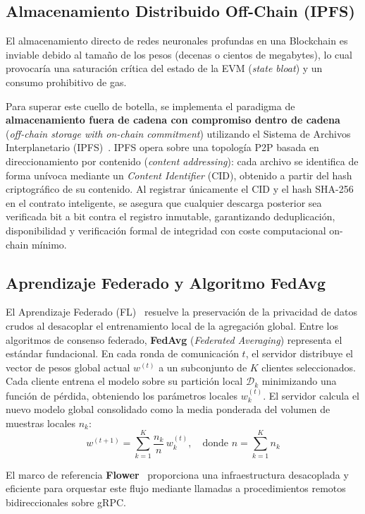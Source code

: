 \subsection{Almacenamiento Distribuido Off-Chain (IPFS)}
El almacenamiento directo de redes neuronales profundas en una Blockchain es inviable debido al tamaño de los pesos (decenas o cientos de megabytes), lo cual provocaría una saturación crítica del estado de la EVM (\textit{state bloat}) y un consumo prohibitivo de gas.

Para superar este cuello de botella, se implementa el paradigma de \textbf{almacenamiento fuera de cadena con compromiso dentro de cadena} (\textit{off-chain storage with on-chain commitment}) utilizando el Sistema de Archivos Interplanetario (IPFS)~\cite{benet2014ipfs}. IPFS opera sobre una topología P2P basada en direccionamiento por contenido (\textit{content addressing}): cada archivo se identifica de forma unívoca mediante un \textit{Content Identifier} (CID), obtenido a partir del hash criptográfico de su contenido. Al registrar únicamente el CID y el hash SHA-256 en el contrato inteligente, se asegura que cualquier descarga posterior sea verificada bit a bit contra el registro inmutable, garantizando deduplicación, disponibilidad y verificación formal de integridad con coste computacional on-chain mínimo.

\subsection{Aprendizaje Federado y Algoritmo FedAvg}
El Aprendizaje Federado (FL)~\cite{mcmahan2017federated} resuelve la preservación de la privacidad de datos crudos al desacoplar el entrenamiento local de la agregación global. Entre los algoritmos de consenso federado, \textbf{FedAvg} (\textit{Federated Averaging}) representa el estándar fundacional. En cada ronda de comunicación $t$, el servidor distribuye el vector de pesos global actual $w^{(t)}$ a un subconjunto de $K$ clientes seleccionados. Cada cliente entrena el modelo sobre su partición local $\mathcal{D}_k$ minimizando una función de pérdida, obteniendo los parámetros locales $w_k^{(t)}$. El servidor calcula el nuevo modelo global consolidado como la media ponderada del volumen de muestras locales $n_k$:
\begin{equation}
w^{(t+1)} = \sum_{k=1}^{K} \frac{n_k}{n} \, w_k^{(t)}, \quad \text{donde } n = \sum_{k=1}^{K} n_k
\end{equation}

El marco de referencia \textbf{Flower}~\cite{beutel2020flower} proporciona una infraestructura desacoplada y eficiente para orquestar este flujo mediante llamadas a procedimientos remotos bidireccionales sobre gRPC.

